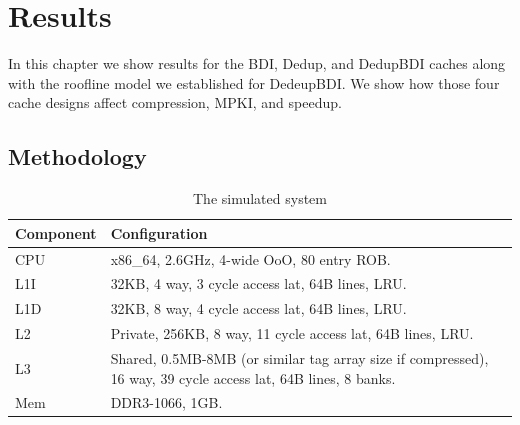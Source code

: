 
\chapter{Results}
\label{ch:Results}

In this chapter we show results for the BDI, Dedup, and DedupBDI caches along with the roofline model we established for DedeupBDI. We show how those four cache designs affect compression, MPKI, and speedup.

\section{Methodology}
\label{sec:Methodology}
\begin{table}[]
    \centering
    \begin{tabular}{ll}
    Component & Configuration                                                                                                 \\ \hline
    CPU       & x86\_64, 2.6GHz, 4-wide OoO, 80 entry ROB.                                                                    \\
    L1I       & 32KB, 4 way, 3 cycle access lat, 64B lines, LRU.                                                              \\
    L1D       & 32KB, 8 way, 4 cycle access lat, 64B lines, LRU.                                                              \\
    L2        & Private, 256KB, 8 way, 11 cycle access lat, 64B lines, LRU.                                                   \\
    L3        & Shared, 0.5MB-8MB (or similar tag array size if compressed), 16 way, 39 cycle access lat, 64B lines, 8 banks. \\
    Mem       & DDR3-1066, 1GB.                                                                                              
    \end{tabular}
    \caption{The simulated system}
    \label{tab:simsys}
\end{table}
